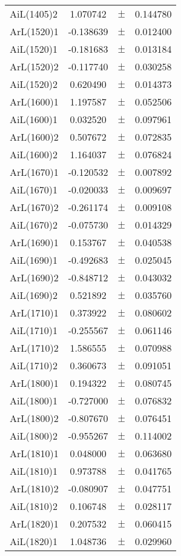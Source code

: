 \begin{table}
\begin{tiny}
\begin{tabular}{lccc}
AiL(1405)2 & 1.070742 & $\pm$ & 0.144780 \\
ArL(1520)1 & -0.138639 & $\pm$ & 0.012400 \\
AiL(1520)1 & -0.181683 & $\pm$ & 0.013184 \\
ArL(1520)2 & -0.117740 & $\pm$ & 0.030258 \\
AiL(1520)2 & 0.620490 & $\pm$ & 0.014373 \\
ArL(1600)1 & 1.197587 & $\pm$ & 0.052506 \\
AiL(1600)1 & 0.032520 & $\pm$ & 0.097961 \\
ArL(1600)2 & 0.507672 & $\pm$ & 0.072835 \\
AiL(1600)2 & 1.164037 & $\pm$ & 0.076824 \\
ArL(1670)1 & -0.120532 & $\pm$ & 0.007892 \\
AiL(1670)1 & -0.020033 & $\pm$ & 0.009697 \\
ArL(1670)2 & -0.261174 & $\pm$ & 0.009108 \\
AiL(1670)2 & -0.075730 & $\pm$ & 0.014329 \\
ArL(1690)1 & 0.153767 & $\pm$ & 0.040538 \\
AiL(1690)1 & -0.492683 & $\pm$ & 0.025045 \\
ArL(1690)2 & -0.848712 & $\pm$ & 0.043032 \\
AiL(1690)2 & 0.521892 & $\pm$ & 0.035760 \\
ArL(1710)1 & 0.373922 & $\pm$ & 0.080602 \\
AiL(1710)1 & -0.255567 & $\pm$ & 0.061146 \\
ArL(1710)2 & 1.586555 & $\pm$ & 0.070988 \\
AiL(1710)2 & 0.360673 & $\pm$ & 0.091051 \\
ArL(1800)1 & 0.194322 & $\pm$ & 0.080745 \\
AiL(1800)1 & -0.727000 & $\pm$ & 0.076832 \\
ArL(1800)2 & -0.807670 & $\pm$ & 0.076451 \\
AiL(1800)2 & -0.955267 & $\pm$ & 0.114002 \\
ArL(1810)1 & 0.048000 & $\pm$ & 0.063680 \\
AiL(1810)1 & 0.973788 & $\pm$ & 0.041765 \\
ArL(1810)2 & -0.080907 & $\pm$ & 0.047751 \\
AiL(1810)2 & 0.106748 & $\pm$ & 0.028117 \\
ArL(1820)1 & 0.207532 & $\pm$ & 0.060415 \\
AiL(1820)1 & 1.048736 & $\pm$ & 0.029960 \\

\end{tabular}
\end{tiny}
\end{table}
